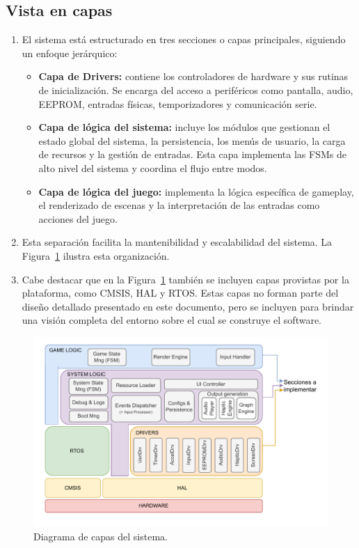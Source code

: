 \documentclass[11pt,a4paper]{article}
\begin{document}
\subsection{Vista en capas}
\begin{enumerate}
  \item El sistema está estructurado en tres secciones o capas principales, siguiendo un enfoque jerárquico:
  \begin{itemize}
    \item \textbf{Capa de Drivers:} contiene los controladores de hardware y sus rutinas de inicialización. Se encarga del acceso a periféricos como pantalla, audio, EEPROM, entradas físicas, temporizadores y comunicación serie.
    \item \textbf{Capa de lógica del sistema:} incluye los módulos que gestionan el estado global del sistema, la persistencia, los menús de usuario, la carga de recursos y la gestión de entradas. Esta capa implementa las FSMs de alto nivel del sistema y coordina el flujo entre modos.
    \item \textbf{Capa de lógica del juego:} implementa la lógica específica de gameplay, el renderizado de escenas y la interpretación de las entradas como acciones del juego.
  \end{itemize}
  \item Esta separación facilita la mantenibilidad y escalabilidad del sistema. La Figura~\ref{fig:diagCapas} ilustra esta organización.
  \item Cabe destacar que en la Figura~\ref{fig:diagCapas} también se incluyen capas provistas por la plataforma, como CMSIS, HAL y RTOS. Estas capas no forman parte del diseño detallado presentado en este documento, pero se incluyen para brindar una visión completa del entorno sobre el cual se construye el software.
\end{enumerate}

\begin{figure}[h]
\centering 
\includegraphics[width=.85\textwidth]{../Figuras/SW_layers.pdf}
\caption{Diagrama de capas del sistema.}
\label{fig:diagCapas}
\end{figure}
\end{document}
